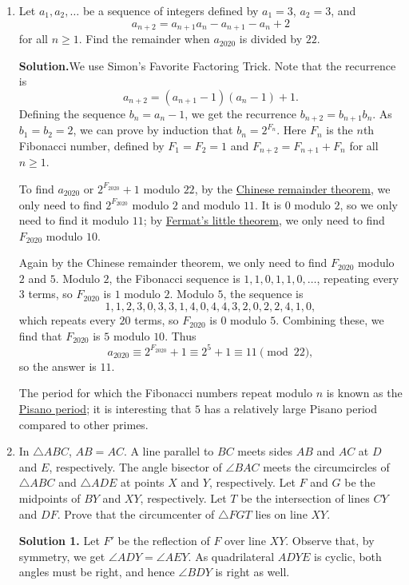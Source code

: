 \documentclass[11pt,paper=letter]{scrartcl}
\newcommand{\sol}{{\sffamily \bfseries Solution.}\;}
\newcommand{\soln}[1]{{\sffamily \bfseries Solution #1.}\;}
\newcommand{\rem}[1]{{\small \sffamily \sansmath {\bfseries Remark.} #1}}
\begin{document}
\begin{enumerate}[left=0pt]
\item Let $a_1, a_2, \ldots$ be a sequence of integers defined by $a_1 = 3$, $a_2 = 3$, and \[
  a_{n+2} = a_{n+1}a_n - a_{n+1} - a_n + 2
\]
for all $n \ge 1$. Find the remainder when $a_{2020}$ is divided by $22$.

\sol We use Simon's Favorite Factoring Trick. Note that the recurrence is
\[
  a_{n+2} = (a_{n+1} - 1)(a_n - 1) + 1.
\]
Defining the sequence $b_n = a_n - 1$, we get the recurrence $b_{n+2} = b_{n+1}b_n$. As $b_1 = b_2 = 2$, we can prove by induction that $b_n = 2^{F_n}$. Here $F_n$ is the $n$th Fibonacci number, defined by $F_1 = F_2 = 1$ and $F_{n+2} = F_{n+1} + F_n$ for all $n \ge 1$.

To find $a_{2020}$ or $2^{F_{2020}} + 1$ modulo $22$, by the \href{https://en.wikipedia.org/wiki/Chinese_remainder_theorem}{Chinese remainder theorem{}}, we only need to find $2^{F_{2020}}$ modulo $2$ and modulo $11$. It is $0$ modulo $2$, so we only need to find it modulo $11$; by \href{https://en.wikipedia.org/wiki/Fermat%27s_little_theorem}{Fermat's little theorem{}}, we only need to find $F_{2020}$ modulo $10$.

Again by the Chinese remainder theorem, we only need to find $F_{2020}$ modulo $2$ and $5$. Modulo $2$, the Fibonacci sequence is $1, 1, 0, 1, 1, 0, \ldots$, repeating every $3$ terms, so $F_{2020}$ is $1$ modulo $2$. Modulo $5$, the sequence is
\[
  1,1,2,3, 0,3,3,1,4, 0,4,4,3,2, 0,2,2,4,1,0,
\]
which repeats every $20$ terms, so $F_{2020}$ is $0$ modulo $5$. Combining these, we find that $F_{2020}$ is $5$ modulo $10$. Thus
\[
  a_{2020} \equiv 2^{F_{2020}} + 1 \equiv 2^5 + 1 \equiv 11 \pmod{22},
\]
so the answer is $11$.

\rem{The period for which the Fibonacci numbers repeat modulo $n$ is known as the \href{https://en.wikipedia.org/wiki/Pisano_period}{Pisano period{}}; it is interesting that $5$ has a relatively large Pisano period compared to other primes.}

\item In $\triangle ABC$, $AB = AC$. A line parallel to $BC$ meets sides $AB$ and $AC$ at $D$ and $E$, respectively. The angle bisector of $\angle BAC$ meets the circumcircles of $\triangle ABC$ and $\triangle ADE$ at points $X$ and $Y$, respectively. Let $F$ and $G$ be the midpoints of $BY$ and $XY$, respectively. Let $T$ be the intersection of lines $CY$ and $DF$. Prove that the  circumcenter of $\triangle FGT$ lies on line $XY$.

\soln1 Let $F'$ be the reflection of $F$ over line $XY$. Observe that, by symmetry, we get $\angle ADY = \angle AEY$. As quadrilateral $ADYE$ is cyclic, both angles must be right, and hence $\angle BDY$ is right as well.


\end{enumerate}
\end{document}
